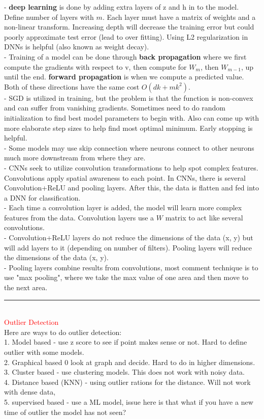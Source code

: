 \documentclass[8pt]{extarticle}
\begin{document}
\begin{multicols*}{2}
- \textbf{deep learning} is done by adding extra layers of z and h in to the model. Define number of layers with $m$. Each layer must have a matrix of weights and a non-linear transform. Increasing depth will decrease the training error but could poorly approximate test error (lead to over fitting). Using L2 regularization in DNNs is helpful (also known as weight decay).
\\
- Training of a model can be done through \textbf{back propagation} where we first compute the gradients with respect to v, then compute for $W_m$, then $W_{m-1}$, up until the end. \textbf{forward propagation} is when we compute a predicted value. Both of these directions have the same cost $O(dk+mk^2)$. 
\\
- SGD is utilized in training, but the problem is that the function is non-convex and can suffer from vanishing gradients. Sometimes need to do random initialization to find best model parameters to begin with. Also can come up with more elaborate step sizes to help find most optimal minimum. Early stopping is helpful.
\\
- Some models may use skip connection where neurons connect to other neurons much more downstream from where they are.
\\
- CNNs seek to utilize convolution transformations to help spot complex features. Convolutions apply spatial awareness to each point. In CNNs, there is several Convolution+ReLU and pooling layers. After this, the data is flatten and fed into a DNN for classification. 
\\
- Each time a convolution layer is added, the model will learn more complex features from the data. Convolution layers use a $W$ matrix to act like several convolutions.
\\
- Convolution+ReLU layers do not reduce the dimensions of the data (x, y) but will add layers to it (depending on number of filters). Pooling layers will reduce the dimensions of the data (x, y).
\\
- Pooling layers combine results from convolutions, most comment technique is to use "max pooling", where we take the max value of one area and then move to the next area.
\\
\rule{\linewidth}{0.5mm} 
\\
\textcolor{red}{Outlier Detection}
\\
Here are ways to do outlier detection:
\\
1. Model based - use z score to see if point makes sense or not. Hard to define outlier with some models.
\\
2. Graphical based 0 look at graph and decide. Hard to do in higher dimensions.
\\
3. Cluster based - use clustering models. This does not work with noisy data.
\\
4. Distance based (KNN) - using outlier rations for the distance. Will not work with dense data,
\\
5. supervised based - use a ML model, issue here is that what if you have a new time of outlier the model has not seen?
\\
\end{multicols*}
\end{document}
